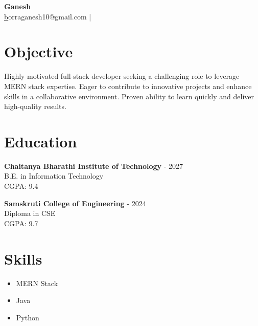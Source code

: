 \documentclass[a4paper,10pt]{article}
\begin{document}
\pagestyle{empty}

\begin{center}
    {\LARGE \textbf{ Ganesh }}\\
    \href{mailto: borraganesh10@gmail.com }borraganesh10@gmail.com \quad |  \\
\end{center}


    
\section*{Objective}
\noindent
Highly motivated full-stack developer seeking a challenging role to leverage MERN stack expertise.  Eager to contribute to innovative projects and enhance skills in a collaborative environment.  Proven ability to learn quickly and deliver high-quality results.
\vspace{0.3cm}


\section*{Education}

    \textbf{ Chaitanya Bharathi Institute of Technology }  - 2027 \\
    {  } B.E. in Information Technology \\
    {  }  CGPA: 9.4

    \textbf{ Samskruti College of Engineering }  - 2024 \\
    {  } Diploma in CSE \\
    {  }  CGPA: 9.7



\section*{Skills}
\begin{itemize}[leftmargin=*]
  
    \item MERN Stack 
  
    \item Java 
  
    \item Python
  
\end{itemize}


\end{document}
